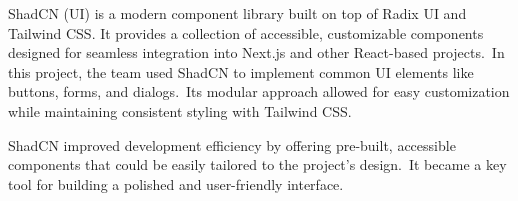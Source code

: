 ShadCN (UI) is a modern component library built on top of Radix UI and Tailwind CSS. It provides a collection of accessible, customizable components designed for seamless integration into Next.js and other React-based projects.\ In this project, the team used ShadCN to implement common UI elements like buttons, forms, and dialogs.\ Its modular approach allowed for easy customization while maintaining consistent styling with Tailwind CSS\@.\cite[ShadCN]{shadcn}

ShadCN improved development efficiency by offering pre-built, accessible components that could be easily tailored to the project’s design.\ It became a key tool for building a polished and user-friendly interface.